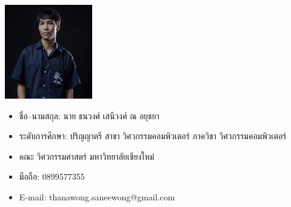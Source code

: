 \documentclass[semifinal]{cpecmu}
\author{นายกฤษฏิ์ อุปนันท์}{Krit Upanun}{600610717}
\author{นายธนวงศ์ เสนีวงศ์ ณ อยุธยา}{Thanawong Saneewong Na Ayutthaya}{600610738}
\begin{document}


\pagestyle{empty}\cleardoublepage
\normalspacing \setcounter{page}{1}  \pagestyle{cpecmu}





\ifproject

\fi



\ifproject
\appendix


\ifglossary\glossarypage\fi

\ifindex\indexpage\fi

\begin{biosketch}
\begin{center}
  \includegraphics[width=1.5in]{./images/tom_pic_resize.png}
\end{center}
\begin{itemize}[label={},leftmargin=*,labelsep=0pt]
  \item ชื่อ--นามสกุล: นาย ธนวงศ์ เสนีวงศ์ ณ อยุธยา
  \item ระดับการศึกษา: ปริญญาตรี สาขา วิศวกรรมคอมพิวเตอร์ ภาควิชา วิศวกรรมคอมพิวเตอร์
  \item คณะ วิศวกรรมศาสตร์ มหาวิทยาลัยเชียงใหม่
  \item มือถือ: 0899577355 
  \item E-mail: thanawong.saneewong@gmail.com
\end{itemize}



\end{biosketch}
\end{document}
